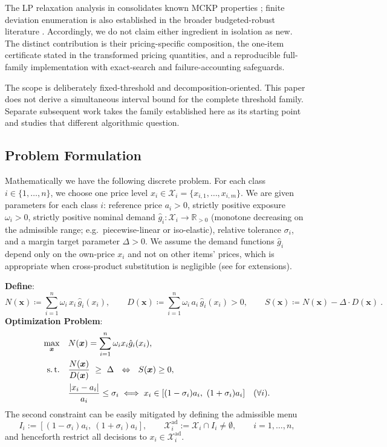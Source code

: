 \documentclass[11pt, a4paper]{article}
\theoremstyle{plain}
\theoremstyle{definition}
\theoremstyle{remark}
\newcommand{\R}{\mathbb{R}}
\begin{document}
The LP relaxation analysis in  consolidates known MCKP properties \citep{Dyer1984,Pisinger1995}; finite deviation enumeration is also established in the broader budgeted-robust literature \citep{BertsimasSim2004,Buesing2023}.  Accordingly, we do not claim either ingredient in isolation as new.  The distinct contribution is their pricing-specific composition, the one-item certificate stated in the transformed pricing quantities, and a reproducible full-family implementation with exact-search and failure-accounting safeguards.

The scope is deliberately fixed-threshold and decomposition-oriented.  This paper does not derive a simultaneous interval bound for the complete threshold family.  Separate subsequent work takes the family established here as its starting point and studies that different algorithmic question.

\subsection{Problem Formulation}
\noindent Mathematically we have the following discrete problem. For each class $i\in\{1,\dots,n\}$, we choose one price level $x_i \in \mathcal X_i=\{x_{i,1},\dots,x_{i,m}\}$. We are given parameters for each class $i$: reference price $a_i>0$, strictly positive exposure $\omega_i>0$, strictly positive nominal demand $\hat{g}_i:\mathcal{X}_i\to \R_{>0}$ (monotone decreasing on the admissible range; e.g.\ piecewise-linear or iso-elastic), relative tolerance $\sigma_i$, and a margin target parameter $\Delta>0$.
We assume the demand functions $\hat{g}_i$ depend only on the own-price $x_i$ and not on other items' prices, which is appropriate when cross-product substitution is negligible (see  for extensions).

\noindent \textbf{Define}:
\[
N(\bm{x}) \coloneqq \sum_{i=1}^n \omega_i\,x_i\,\hat{g}_i(x_i),\qquad
D(\bm{x}) \coloneqq \sum_{i=1}^n \omega_i\,a_i\,\hat{g}_i(x_i)>0,\qquad
S(\bm{x}) \coloneqq N(\bm{x})-\Delta \cdot D(\bm{x})\ .
\]
\textbf{Optimization Problem}:
\begin{align}
\max_{\bm{x}}\quad & N(\bm{x})=\sum_{i=1}^n \omega_i x_i \hat{g}_i(x_i),\\
\text{s.\,t.}\quad &
\frac{N(\bm{x})}{D(\bm{x})}\ \ge\ \Delta\ \ \Leftrightarrow\ \ S(\bm{x})\ge0,\\
&
\frac{|x_i - a_i|}{a_i} \le \sigma_i \iff x_{i}\in [(1-\sigma_{i} )a_{i},\  (1+\sigma_{i} )a_{i}] \quad (\forall i).
\end{align}
The second constraint can be easily mitigated by defining the admissible menu
\[
I_{i}:=\left[ \left( 1-\sigma_{i} \right) a_{i},\  \left( 1+\sigma_{i} \right) a_{i} \right], \qquad
\mathcal X_i^{\mathrm{ad}} := \mathcal X_i \cap I_i \neq \emptyset,\qquad i=1,\dots,n,
\]
and henceforth restrict all decisions to $x_i\in \mathcal X_i^{\mathrm{ad}}$.
\end{document}
